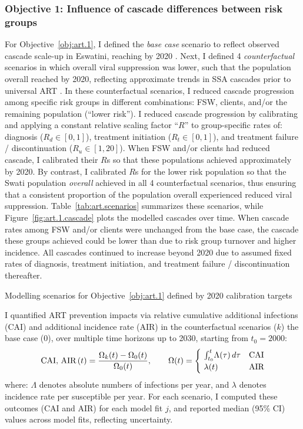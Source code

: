 \subsubsection{Objective 1: Influence of cascade differences between risk groups}\label{art.meth.obj.1}
For Objective~\ref{obj:art.1},
I defined the \emph{base case} scenario to reflect
observed cascade scale-up in Eswatini, reaching \cashi by 2020 \cite{AIDSinfo}.
Next, I defined 4 \emph{counterfactual} scenarios in which overall viral suppression was lower,
such that the population overall reached \casmd by 2020,
reflecting approximate trends in SSA cascades prior to universal ART \cite{AIDSinfo}.
In these counterfactual scenarios, I reduced cascade progression
among specific risk groups in different combinations:
FSW, clients, and/or the remaining population (``lower risk'').
I reduced cascade progression by calibrating and applying
a constant relative scaling factor ``$R$'' to group-specific rates of:
diagnosis ($R_d \in [0,1]$),
treatment initiation ($R_t \in [0,1]$), and
treatment failure / discontinuation ($R_u \in [1,20]$).
When FSW and/or clients had reduced cascade, I calibrated their $R$s so that
these populations achieved approximately \caslo by 2020.
By contrast, I calibrated $R$s for the lower risk population so that
the Swati population \emph{overall} achieved \casmd in all 4 counterfactual scenarios,
thus ensuring that a consistent proportion of the population overall
experienced reduced viral suppression.
Table~\ref{tab:art.scenarios} summarizes these scenarios, while
Figure~\ref{fig:art.1.cascade} plots the modelled cascades over time.
When cascade rates among FSW and/or clients were unchanged from the base case,
the cascade these groups achieved could be lower than \cashi
due to risk group turnover and higher incidence.
All cascades continued to increase beyond 2020 due to assumed fixed rates of
diagnosis, treatment initiation, and treatment failure / discontinuation thereafter.
\begin{table}
  \centering
  \caption{Modelling scenarios for Objective~\ref{obj:art.1} defined by 2020 calibration targets}
  \label{tab:art.scenarios}
  
\end{table}
\par
I quantified ART prevention impacts via relative
cumulative additional infections (CAI) and additional incidence rate (AIR)
in the counterfactual scenarios ($k$) \vs the base case ($0$),
over multiple time horizons up to 2030, starting from $t_0 = 2000$:
\begin{equation}
  \textnormal{CAI, AIR}\,(t) = \frac{\Omega_{k}(t) - \Omega_{0}(t)}{\Omega_{0}(t)}
  ,\qquad \Omega(t) =
  \begin{cases}
    ~\int_{t_0}^{t}\!\Lambda(\tau)\,d\tau & \textnormal{CAI} \\
    ~\lambda(t) & \textnormal{AIR}
  \end{cases}
\end{equation} where:
$\Lambda$ denotes absolute numbers of infections per year, and
$\lambda$ denotes incidence rate per susceptible per year.
For each scenario, I computed these outcomes (CAI and AIR) for each model fit $j$,
and reported median (95\% CI) values across model fits, reflecting uncertainty.
